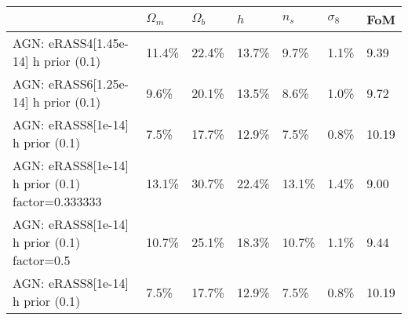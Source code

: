 \begin{tabular}{lllllll}
\toprule
{} & $\Omega_m$ & $\Omega_b$ &     $h$ &   $n_s$ & $\sigma_8$ &    FoM \\
\midrule
AGN: eRASS4[1.45e-14] h prior (0.1)              &     11.4\% &     22.4\% &  13.7\% &   9.7\% &      1.1\% &   9.39 \\
AGN: eRASS6[1.25e-14] h prior (0.1)              &      9.6\% &     20.1\% &  13.5\% &   8.6\% &      1.0\% &   9.72 \\
AGN: eRASS8[1e-14] h prior (0.1)                 &      7.5\% &     17.7\% &  12.9\% &   7.5\% &      0.8\% &  10.19 \\
AGN: eRASS8[1e-14] h prior (0.1) factor=0.333333 &     13.1\% &     30.7\% &  22.4\% &  13.1\% &      1.4\% &   9.00 \\
AGN: eRASS8[1e-14] h prior (0.1) factor=0.5      &     10.7\% &     25.1\% &  18.3\% &  10.7\% &      1.1\% &   9.44 \\
AGN: eRASS8[1e-14] h prior (0.1)                 &      7.5\% &     17.7\% &  12.9\% &   7.5\% &      0.8\% &  10.19 \\
\bottomrule
\end{tabular}
